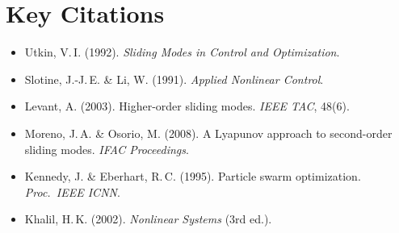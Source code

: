 \documentclass[11pt, a4paper]{article}
\begin{document}
\section{Key Citations}

\begin{itemize}[noitemsep]
  \item Utkin, V.\,I. (1992). \textit{Sliding Modes in Control and Optimization}.
  \item Slotine, J.-J.\,E. \& Li, W. (1991). \textit{Applied Nonlinear Control}.
  \item Levant, A. (2003). Higher-order sliding modes. \textit{IEEE TAC}, 48(6).
  \item Moreno, J.\,A. \& Osorio, M. (2008). A Lyapunov approach to
        second-order sliding modes. \textit{IFAC Proceedings}.
  \item Kennedy, J. \& Eberhart, R.\,C. (1995). Particle swarm optimization.
        \textit{Proc.\ IEEE ICNN}.
  \item Khalil, H.\,K. (2002). \textit{Nonlinear Systems} (3rd ed.).
\end{itemize}

\end{document}

